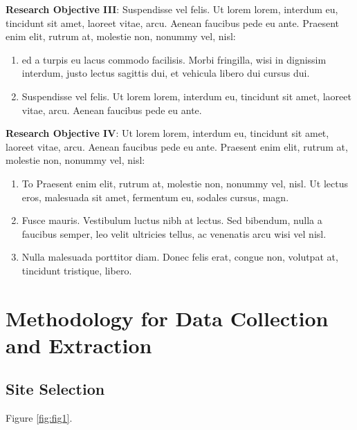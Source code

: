\documentclass{article}
\begin{document}
\noindent
\textbf{Research Objective III}: Suspendisse vel felis. Ut lorem lorem, interdum eu, tincidunt sit amet, laoreet vitae, arcu. Aenean faucibus
pede eu ante. Praesent enim elit, rutrum at, molestie non, nonummy vel, nisl:

    \begin{enumerate}

        \item ed a turpis eu lacus commodo facilisis. Morbi fringilla, wisi in dignissim interdum, justo lectus sagittis dui, et vehicula libero dui cursus dui.

        \item Suspendisse vel felis. Ut lorem lorem, interdum eu, tincidunt sit amet, laoreet vitae, arcu. Aenean faucibus pede eu ante.
        
    \end{enumerate}

\noindent
\textbf{Research Objective IV}:  Ut lorem lorem, interdum eu, tincidunt sit amet, laoreet vitae, arcu. Aenean faucibus pede eu ante. Praesent enim elit, rutrum at, molestie non, nonummy vel, nisl:

    \begin{enumerate}
        
        \item To Praesent enim elit, rutrum at, molestie non, nonummy vel, nisl. Ut lectus eros, malesuada sit amet, fermentum eu, sodales cursus, magn.

        \item Fusce mauris. Vestibulum luctus nibh at lectus. Sed bibendum, nulla a faucibus semper, leo velit ultricies tellus, ac venenatis arcu wisi vel nisl.

        \item Nulla malesuada porttitor diam. Donec felis erat, congue non, volutpat at, tincidunt tristique, libero. 
    \end{enumerate}


\section{Methodology for Data Collection and Extraction}
\lipsum[1-2]

\subsection{Site Selection}
\lipsum[1] Figure \ref{fig:fig1}.

\lipsum[4]
\end{document}
